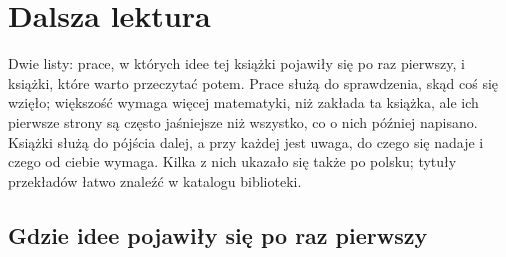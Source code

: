 
\chapter{Dalsza lektura}
\label{app:reading}

\noindent
Dwie listy: prace, w których idee tej książki pojawiły się po raz pierwszy,
i książki, które warto przeczytać potem. Prace służą do sprawdzenia, skąd
coś się wzięło; większość wymaga więcej matematyki, niż zakłada ta książka,
ale ich pierwsze strony są często jaśniejsze niż wszystko, co o nich później
napisano. Książki służą do pójścia dalej, a przy każdej jest uwaga, do czego
się nadaje i czego od ciebie wymaga. Kilka z nich ukazało się także po
polsku; tytuły przekładów łatwo znaleźć w katalogu biblioteki.

\section{Gdzie idee pojawiły się po raz pierwszy}
\label{sec:appd-papers}

